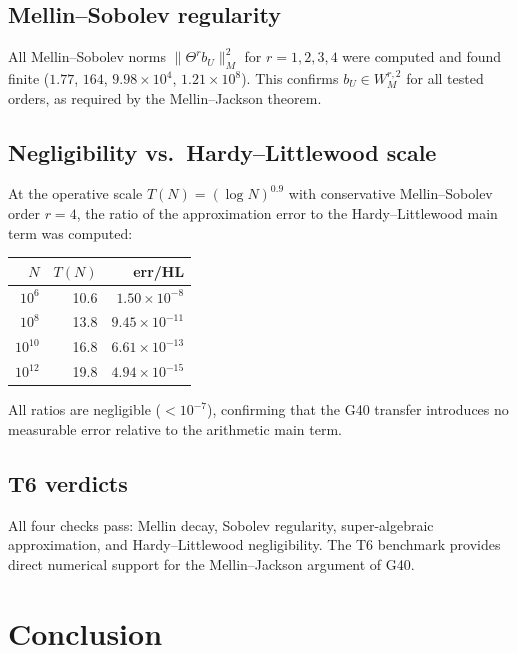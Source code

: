 \documentclass[11pt,a4paper]{article}
\begin{document}
\subsection{Mellin--Sobolev regularity}

All Mellin--Sobolev norms $\|\Theta^r b_U\|_M^2$ for $r=1,2,3,4$ were computed and found finite ($1.77$, $164$, $9.98\times10^4$, $1.21\times10^8$).  This confirms $b_U\in W^{r,2}_M$ for all tested orders, as required by the Mellin--Jackson theorem.

\subsection{Negligibility vs.\ Hardy--Littlewood scale}

At the operative scale $T(N)=(\log N)^{0.9}$ with conservative Mellin--Sobolev order $r=4$, the ratio of the approximation error to the Hardy--Littlewood main term was computed:

\begin{center}
\begin{tabular}{@{}rrr@{}}
\toprule
$N$ & $T(N)$ & err/HL \\
\midrule
$10^6$ & 10.6 & $1.50\times10^{-8}$ \\
$10^8$ & 13.8 & $9.45\times10^{-11}$ \\
$10^{10}$ & 16.8 & $6.61\times10^{-13}$ \\
$10^{12}$ & 19.8 & $4.94\times10^{-15}$ \\
\bottomrule
\end{tabular}
\end{center}

All ratios are negligible ($<10^{-7}$), confirming that the G40 transfer introduces no measurable error relative to the arithmetic main term.

\subsection{T6 verdicts}

All four checks pass: Mellin decay, Sobolev regularity, super-algebraic approximation, and Hardy--Littlewood negligibility.  The T6 benchmark provides direct numerical support for the Mellin--Jackson argument of G40.

\section{Conclusion}
\end{document}

